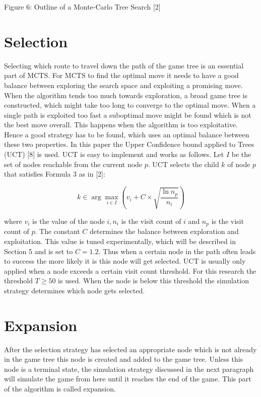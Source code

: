 \documentclass[10pt]{article}
\begin{document}
Figure 6: Outline of a Monte-Carlo Tree Search [2]

\section*{Selection}
Selecting which route to travel down the path of the game tree is an essential part of MCTS. For MCTS to find the optimal move it needs to have a good balance between exploring the search space and exploiting a promising move. When the algorithm tends too much towards exploration, a broad game tree is constructed, which might take too long to converge to the optimal move. When a single path is exploited too fast a suboptimal move might be found which is not the best move overall. This happens when the algorithm is too exploitative. Hence a good strategy has to be found, which uses an optimal balance between these two properties. In this paper the Upper Confidence bound applied to Trees (UCT) [8] is used. UCT is easy to implement and works as follows. Let $I$ be the set of nodes reachable from the current node $p$. UCT selects the child $k$ of node $p$ that satisfies Formula 3 as in [2]:


\begin{equation*}
k \in \arg \max _{i \in I}\left(v_{i}+C \times \sqrt{\frac{\ln n_{p}}{n_{i}}}\right) \tag{3}
\end{equation*}


where $v_{i}$ is the value of the node $i, n_{i}$ is the visit count of $i$ and $n_{p}$ is the visit count of $p$. The constant $C$ determines the balance between exploration and exploitation. This value is tuned experimentally, which will be described in Section 5 and is set to $C=1.2$. Thus when a certain node in the path often leads to success the more likely it is this node will get selected. UCT is usually only applied when a node exceeds a certain visit count threshold. For this research the threshold $T \geq 50$ is used. When the node is below this threshold the simulation strategy determines which node gets selected.

\section*{Expansion}
After the selection strategy has selected an appropriate node which is not already in the game tree this node is created and added to the game tree. Unless this node is a terminal state, the simulation strategy discussed in the next paragraph will simulate the game from here until it reaches the end of the game. This part of the algorithm is called expansion.
\end{document}
